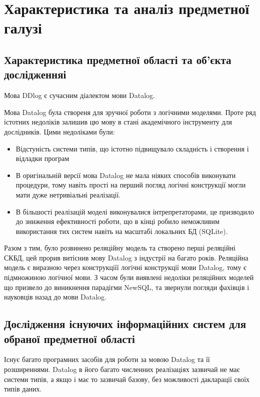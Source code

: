 \chapter{Характеристика та аналіз предметної галузі} 
\label{chap:first}

\section{Характеристика предметної області та об’єкта дослідженняі}

Мова DDlog є сучасним діалектом мови Datalog.

Мова Datalog була створеня для зручної роботи з логічними моделями. Проте ряд істотних недоліків залишив цю мову в стані академічного інструменту для дослідників. Цими недоліками були:
\begin{itemize}

\item Відстуність системи типів, що істотно підвищувало складність і створення і відладки програм

\item В оригінальній версії мова Datalog не мала ніяких способів виконувати процедури, тому навіть прості на перший погляд логічні конструкції могли мати дуже нетривіальні реалізації.

\item В більшості реалізацій моделі виконувалися інтрепретаторами, це призводило до зниження ефективності роботи, що в кінці робило неможливим використання тих систем навіть на масштабі локальних БД (SQLite).

\end{itemize}

Разом з тим, було розвинено реляційну модель та створено перші реляційні СКБД, цей прорив витіснив мову Datalog з індустрії на багато років. Реляційна модель є виразною  через конструкціїї логічні конструкції мови Datalog, тому є підмножиною логічної мови. З часом були виявлені недоліки реляційних моделей що призвело до виникнення парадігми NewSQL, та звернули погляди фахівців і науковців назад до мови Datalog.

\section{Дослідження існуючих інформаційних систем для обраної предметної області}

Існує багато програмних засобів для роботи за мовою Datalog та її розширеннями. Datalog в його багато численних реалізаціях зазвичай не має системи типів, а якщо і має то зазвичай базову, без можливості дакларації своїх типів даних.

